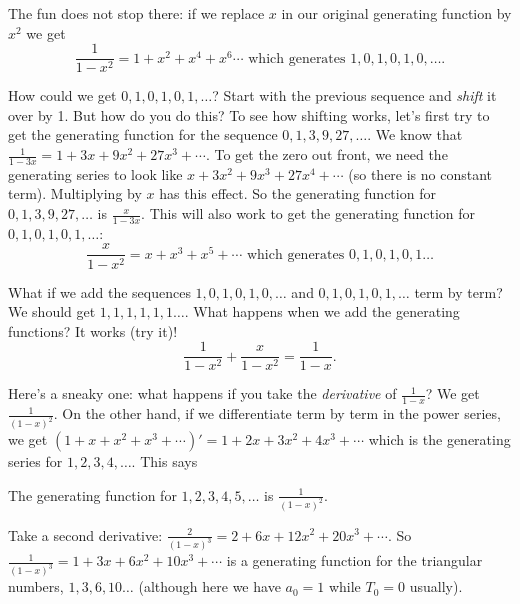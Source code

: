 \documentclass[10pt,]{book}
\theoremstyle{plain}
\theoremstyle{definition}
\theoremstyle{definition}
\theoremstyle{definition}
\theoremstyle{definition}
\numberwithin{equation}{chapter}
\def\d{\displaystyle}
\begin{document}
\hypertarget{p-970}{}%
The fun does not stop there: if we replace \(x\) in our original generating function by \(x^2\) we get%
\begin{equation*}
\frac{1}{1-x^2} = 1 + x^2  + x^4 + x^6\cdots \mbox{ which generates }  1, 0, 1, 0, 1, 0, \ldots.
\end{equation*}
%
\par
\hypertarget{p-971}{}%
How could we get \(0,1,0,1,0,1,\ldots\)? Start with the previous sequence and \emph{shift} it over by 1. But how do you do this? To see how shifting works, let's first try to get the generating function for the sequence \(0, 1, 3, 9, 27, \ldots\). We know that \(\frac{1}{1-3x} = 1 + 3x + 9x^2 + 27x^3 + \cdots\). To get the zero out front, we need the generating series to look like \(x + 3x^2 + 9x^3 + 27x^4+ \cdots\) (so there is no constant term). Multiplying by \(x\) has this effect. So the generating function for \(0, 1, 3, 9, 27, \ldots\) is \(\frac{x}{1-3x}\). This will also work to get the generating function for \(0,1,0,1,0,1,\ldots\):%
\begin{equation*}
\frac{x}{1-x^2} = x + x^3 + x^5 + \cdots \mbox{ which generates }  0, 1, 0, 1, 0 , 1 \ldots
\end{equation*}
%
\par
\hypertarget{p-972}{}%
What if we add the sequences \(1,0,1,0,1,0,\ldots\) and \(0,1,0,1,0,1,\ldots\) term by term? We should get \(1,1,1,1,1,1\ldots\). What happens when we add the generating functions? It works (try it)!%
\begin{equation*}
\frac{1}{1-x^2} + \frac{x}{1-x^2} = \frac{1}{1-x}.
\end{equation*}
%
\par
\hypertarget{p-973}{}%
Here's a sneaky one: what happens if you take the \emph{derivative} of \(\frac{1}{1-x}\)? We get \(\frac{1}{(1-x)^2}\). On the other hand, if we differentiate term by term in the power series, we get \((1 + x + x^2 + x^3 + \cdots)' = 1 + 2x + 3x^2 + 4x^3 + \cdots\) which is the generating series for \(1, 2, 3, 4, \ldots\). This says%
\begin{assemblage}[\(1,2,3,\ldots\)]\label{assemblage-13}
\hypertarget{p-974}{}%
The generating function for \(1, 2, 3, 4, 5, \ldots\) is \(\d\frac{1}{(1-x)^2}.\)%
\end{assemblage}
\hypertarget{p-975}{}%
Take a second derivative: \(\frac{2}{(1-x)^3} = 2 + 6x + 12x^2 + 20x^3 + \cdots\). So \(\frac{1}{(1-x)^3} = 1 + 3x + 6x^2 + 10x^3 + \cdots\) is a generating function for the triangular numbers, \(1,3,6,10\ldots\) (although here we have \(a_0 = 1\) while \(T_0 = 0\) usually).%
\typeout{************************************************}
\typeout{************************************************}
\end{document}
